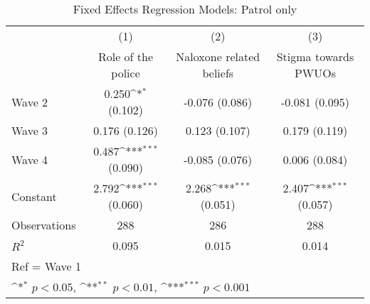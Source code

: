 \begin{table}[htbp]\centering
\def\sym#1{\ifmmode^{#1}\else\(^{#1}\)\fi}
\caption{Fixed Effects Regression Models: Patrol only}
\begin{tabular}{l*{3}{c}}
\toprule
                &\multicolumn{1}{c}{(1)}&\multicolumn{1}{c}{(2)}&\multicolumn{1}{c}{(3)}\\
                &\multicolumn{1}{c}{Role of the police}&\multicolumn{1}{c}{Naloxone related beliefs}&\multicolumn{1}{c}{Stigma towards PWUOs}\\
\midrule
Wave 2          &0.250\sym{*} (0.102)         &-0.076 (0.086)         &-0.081 (0.095)         \\
\addlinespace
Wave 3          &0.176 (0.126)         &0.123 (0.107)         &0.179 (0.119)         \\
\addlinespace
Wave 4          &0.487\sym{***} (0.090)         &-0.085 (0.076)         &0.006 (0.084)         \\
\addlinespace
Constant        &2.792\sym{***} (0.060)         &2.268\sym{***} (0.051)         &2.407\sym{***} (0.057)         \\
\midrule
Observations    &      288         &      286         &      288         \\
\(R^{2}\)       &    0.095         &    0.015         &    0.014         \\
\bottomrule
\multicolumn{4}{l}{\footnotesize Ref = Wave 1}\\
\multicolumn{4}{l}{\footnotesize \sym{*} \(p<0.05\), \sym{**} \(p<0.01\), \sym{***} \(p<0.001\)}\\
\end{tabular}
\end{table}
